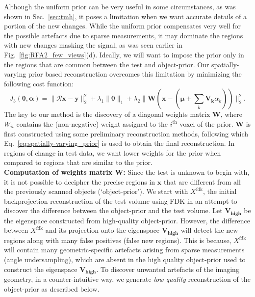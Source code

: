 \documentclass[journal]{IEEEtran}
\begin{document}
Although the uniform prior can be very useful in some
circumstances, as was shown in Sec.~\ref{sec:tmh}, it poses a 
limitation when we want accurate details of a portion of the new changes. While the
uniform prior compensates very well for the possible artefacts due to
sparse measurements, it may dominate the regions with new changes masking
the signal, as was seen earlier in Fig.~\ref{fig:RFA2_few_views}(d). Ideally, we
will want to impose the prior only in the regions that are common
between the test and object-prior.  Our spatially-varying prior based
reconstruction overcomes this limitation by minimizing the following
cost function:
\begin{equation}
J_3(\boldsymbol{\theta},\boldsymbol{\alpha}) = \lVert\boldsymbol{\mathcal{R} x}-\boldsymbol{y}\rVert_2^2  + \lambda_1\lVert\boldsymbol{\theta}\rVert_1 +\lambda_2\lVert\boldsymbol{W}(\boldsymbol{x} - (\boldsymbol{\mu} + \sum_{k}\boldsymbol{V_k}\alpha_k))\rVert_2^2.
\label{eq:spatially-varying_prior}
\end{equation}
The key to our method is the discovery of a diagonal weights
 matrix $\boldsymbol{W}$, where $W_{ii}$ contains the (non-negative) weight assigned to the $i^{\textrm{th}}$ voxel of the prior. $\boldsymbol{W}$ is first constructed using some preliminary reconstruction methods, following which Eq.~\ref{eq:spatially-varying_prior} is used to obtain the final reconstruction. In regions of change in test data, we want lower weights for the prior when compared to regions that are similar to the prior.  
 \\
 
\textbf{Computation of weights matrix $\boldsymbol{W}$:}
Since the test is unknown to
begin with, it is not possible to decipher the precise regions in
$\boldsymbol{x}$ that are different from all the previously scanned
objects (`object-prior'). We start with $X^{\text{fdk}}$, the initial
backprojection reconstruction of the test volume using FDK in an attempt to
discover the difference between the object-prior and the test
volume. Let $\boldsymbol{V_{\text{high}}}$ be the eigenspace
constructed from high-quality object-prior. However, the difference
between $X^{\text{fdk}}$ and its projection onto the eigenspace
$\boldsymbol{V_{\text{high}}}$ will detect the new regions along with
many false positives (false new regions). This is because,
$X^{\text{fdk}}$ will contain many geometric-specific artefacts
arising from sparse measurements (angle undersampling), which are
absent in the high quality object-prior used to construct the
eigenspace $\boldsymbol{V_{\text{high}}}$. To discover unwanted
artefacts of the imaging geometry, in a counter-intuitive way, we
generate \emph{low quality} reconstruction of the object-prior as
described below.
\\
\end{document}
